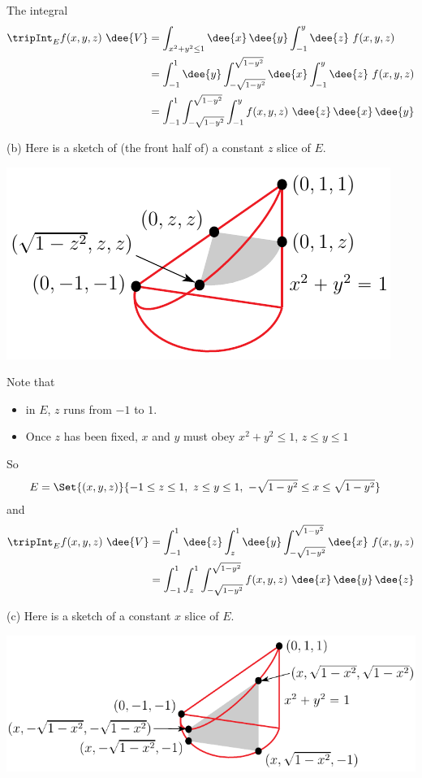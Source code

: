 \begin{solution}
The integral
\begin{align*}
\tripInt_E f(x,y,z)\ \dee{V}
&=\int_{x^2+y^2\le 1}\dee{x}\,\dee{y}\int_{-1}^y\dee{z}\ f(x,y,z) \\
&=\int_{-1}^1\dee{y}\int_{-\sqrt{1-y^2}}^{\sqrt{1-y^2}}\dee{x}
        \int_{-1}^y\dee{z}\ f(x,y,z) \\
&=\int_{-1}^1\int_{-\sqrt{1-y^2}}^{\sqrt{1-y^2}}
        \int_{-1}^y f(x,y,z)\ \dee{z}\,\dee{x}\,\dee{y} 
\end{align*}



(b)
Here is a sketch of (the front half of) a constant $z$  slice of $E$.

\begin{center}
\includegraphics{fig/OE15D_7B.pdf}
\end{center}

Note that
\begin{itemize}
\item
  in $E$, $z$ runs from $-1$ to $1$.
\item 
  Once $z$ has been fixed, $x$ and $y$ must obey $x^2+y^2\le 1$,
     $z\le y\le 1$
\end{itemize}
So 
\begin{align*}
E &= \Set{(x,y,z)}{-1\le z\le 1,\ z\le y\le 1,\ 
            -\sqrt{1-y^2}\le x\le\sqrt{1-y^2}} 
\end{align*}
and 
\begin{align*}
\tripInt_E f(x,y,z)\ \dee{V}
&=\int_{-1}^1\dee{z}\int_z^1\dee{y}
         \int_{-\sqrt{1-y^2}}^{\sqrt{1-y^2}}\dee{x}\ f(x,y,z) \\
&=\int_{-1}^1\int_z^1 \int_{-\sqrt{1-y^2}}^{\sqrt{1-y^2}}
              f(x,y,z)\ \dee{x}\,\dee{y}\,\dee{z} 
\end{align*}


(c)
Here is a sketch of a constant $x$  slice of $E$.

\begin{center}
\includegraphics{fig/OE15D_7C.pdf}
\end{center}


\end{solution}
